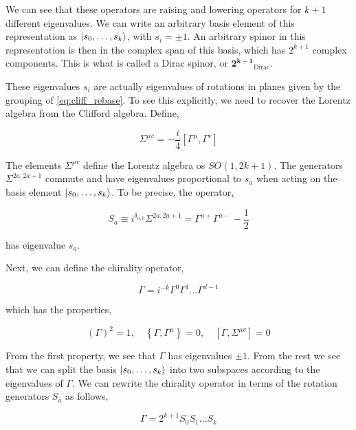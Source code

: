 We can see that these operators are raising and lowering operators for $k+1$ different eigenvalues. We can write an arbitrary basis element of this representation as $\lvert s_0, \dots, s_{k}\rangle$, with $s_i = \pm 1$. An arbitrary spinor in this representation is then in the complex span of this basis, which has $2^{k+1}$ complex components. This is what is called a Dirac spinor, or $\mathbf{2^{k+1}}_{\text{Dirac}}$.

These eigenvalues $s_i$ are actually eigenvalues of rotations in planes given by the grouping of \ref{eq:cliff_rebase}. To see this explicitly, we need to recover the Lorentz algebra from the Clifford algebra. Define,

\begin{equation}
    \Sigma^{\mu v}=-\frac{i}{4}\left[\Gamma^\mu, \Gamma^v\right]
\end{equation}

The elements $\Sigma^{\mu v}$ define the Lorentz algebra os $SO(1, 2k+1)$. The generators $\Sigma^{2a,2a+1}$ commute and have eigenvalues proportional to $s_a$ when acting on the basis element $\lvert s_0, \dots, s_{k}\rangle$. To be precise, the operator,

\begin{equation}
    S_a \equiv i^{\delta_{a, 0}} \Sigma^{2 a, 2 a+1}=\Gamma^{a+} \Gamma^{a-}-\frac{1}{2}
\end{equation}

has eigenvalue $s_a$.

Next, we can define the chirality operator,

\begin{equation}
    \label{eq:chirality_op}
    \Gamma=i^{-k} \Gamma^0 \Gamma^1 \ldots \Gamma^{d-1}
\end{equation}

which has the properties,

\begin{equation}
    \label{eq:chiral_properties}
    (\Gamma)^2=1, \quad\left\{\Gamma, \Gamma^\mu\right\}=0, \quad\left[\Gamma, \Sigma^{\mu v}\right]=0
\end{equation}

From the first property, we see that $\Gamma$ has eigenvalues $\pm 1$. From the rest we see that we can split the basis $\lvert s_0,\dots,s_k\rangle$ into two subspaces according to the eigenvalues of $\Gamma$. We can rewrite the chirality operator in terms of the rotation generators $S_a$ as follows,

\begin{equation}
    \Gamma=2^{k+1} S_0 S_1 \ldots S_k
\end{equation}

